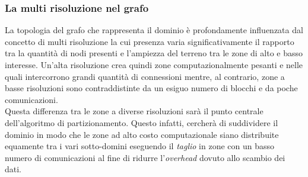 \subsubsection{La multi risoluzione nel grafo}
La topologia del grafo che rappresenta il dominio è profondamente influenzata dal concetto di multi risoluzione la cui presenza varia significativamente il rapporto tra la quantità di nodi presenti e l'ampiezza del terreno tra le zone di alto e basso interesse. Un'alta risoluzione crea quindi zone computazionalmente pesanti e nelle quali intercorrono grandi quantità di connessioni mentre, al contrario, zone a basse risoluzioni sono contraddistinte da un esiguo numero di blocchi e da poche comunicazioni.\\
Questa differenza tra le zone a diverse risoluzioni sarà il punto centrale dell'algoritmo di partizionamento. Questo infatti, cercherà di suddividere il dominio in modo che le zone ad alto costo computazionale siano distribuite equamente tra i vari sotto-domini eseguendo il \textit{taglio} in zone con un basso numero di comunicazioni al fine di ridurre l'\textit{overhead} dovuto allo scambio dei dati.
